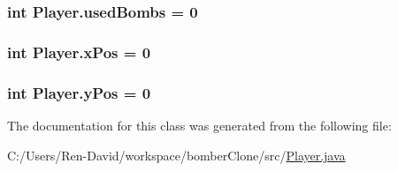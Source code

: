 \subsubsection[{used\+Bombs}]{\setlength{\rightskip}{0pt plus 5cm}int Player.\+used\+Bombs = 0\hspace{0.3cm}{\ttfamily [private]}}\label{class_player_ab6fd5604046c7ddee01bd5f9b9e69341}
\hypertarget{class_player_a280608b62fdcd7f31cb54cf0787cff7f}{}
\subsubsection[{x\+Pos}]{\setlength{\rightskip}{0pt plus 5cm}int Player.\+x\+Pos = 0\hspace{0.3cm}{\ttfamily [private]}}\label{class_player_a280608b62fdcd7f31cb54cf0787cff7f}
\hypertarget{class_player_aa2706c56cfb101d02b73e371cfb98cd1}{}
\subsubsection[{y\+Pos}]{\setlength{\rightskip}{0pt plus 5cm}int Player.\+y\+Pos = 0\hspace{0.3cm}{\ttfamily [private]}}\label{class_player_aa2706c56cfb101d02b73e371cfb98cd1}


The documentation for this class was generated from the following file\+:\begin{DoxyCompactItemize}
\item 
C\+:/\+Users/\+Ren-\/\+David/workspace/bomber\+Clone/src/\hyperlink{_player_8java}{Player.\+java}\end{DoxyCompactItemize}
